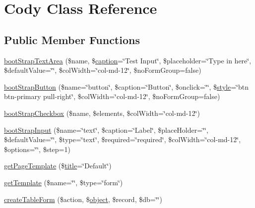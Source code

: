 \hypertarget{classCody}{}\section{Cody Class Reference}
\label{classCody}
\subsection*{Public Member Functions}
\begin{DoxyCompactItemize}
\item 
\hyperlink{classCody_aa2995d370fea29cedab1eed4dd166f8b}{boot\+Strap\+Text\+Area} (\$name, \$\hyperlink{Shape_8php_af310fcd32ca64d696b944cf99bf602ff}{caption}=\char`\"{}Test Input\char`\"{}, \$placeholder=\char`\"{}Type in here\char`\"{}, \$default\+Value=\char`\"{}\char`\"{}, \$col\+Width=\char`\"{}col-\/md-\/12\char`\"{}, \$no\+Form\+Group=false)
\item 
\hyperlink{classCody_a97155a3cb1c7b9e33e0d64229a8a6cbe}{boot\+Strap\+Button} (\$name=\char`\"{}button\char`\"{}, \$caption=\char`\"{}Button\char`\"{}, \$onclick=\char`\"{}\char`\"{}, \$\hyperlink{Shape_8php_aa43717795ebf0302891b9f9d9bf4ca9d}{style}=\char`\"{}btn btn-\/primary pull-\/right\char`\"{}, \$col\+Width=\char`\"{}col-\/md-\/12\char`\"{}, \$no\+Form\+Group=false)
\item 
\hyperlink{classCody_a45e229b7967b4e124471055f4b311a55}{boot\+Strap\+Checkbox} (\$name, \$elements, \$col\+Width=\char`\"{}col-\/md-\/12\char`\"{})
\item 
\hyperlink{classCody_a22dc3bebf4ba3deec1837ab58f6bc209}{boot\+Strap\+Input} (\$name=\char`\"{}text\char`\"{}, \$caption=\char`\"{}Label\char`\"{}, \$place\+Holder=\char`\"{}\char`\"{}, \$default\+Value=\char`\"{}\char`\"{}, \$type=\char`\"{}text\char`\"{}, \$required=\char`\"{}required\char`\"{}, \$col\+Width=\char`\"{}col-\/md-\/12\char`\"{}, \$options=\char`\"{}\char`\"{}, \$step=1)
\item 
\hyperlink{classCody_ab057111a248c76bd14a343324cec432e}{get\+Page\+Template} (\$\hyperlink{Shape_8php_ad264ad0cabbe965bf7f7c8a5ed6abebb}{title}=\char`\"{}Default\char`\"{})
\item 
\hyperlink{classCody_a6a0695d4357474925cd6f42e5ce5b248}{get\+Template} (\$name=\char`\"{}\char`\"{}, \$type=\char`\"{}form\char`\"{})
\item 
\hyperlink{classCody_a6ffe5d421ef90aebaedeb33bcc6bcc3e}{create\+Table\+Form} (\$action, \$\hyperlink{Shape_8php_a774642dc290de09e3aff55c8b594113f}{object}, \$record, \$db=\char`\"{}\char`\"{})

\end{DoxyCompactItemize}
